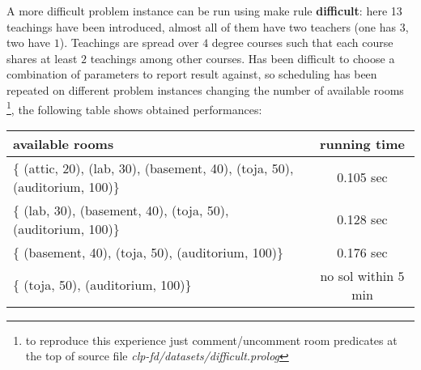 \documentclass[10pt,a4paper]{article} %
\begin{document}
    A more difficult problem instance can be run using make rule \textbf{difficult}:
    here 13 teachings have been introduced, almost all of them have two teachers
    (one has $3$, two have $1$). Teachings are spread over $4$ degree courses
    such that each course shares at least $2$ teachings among other courses.
    Has been difficult to choose a combination of parameters to report result against,
    so scheduling has been repeated on different problem instances changing
    the number of available rooms
    \footnote{to reproduce this experience just comment/uncomment room predicates at the
    top of source file \emph{clp-fd/datasets/difficult.prolog}},
    the following table shows obtained performances:

    \begin{center}
        \begin{tabular}{p{6cm} | c}
            \textbf{available rooms} & \textbf{running time} \\
            \hline
            $ \lbrace $ (attic, 20), (lab, 30), (basement, 40),
                (toja, 50), (auditorium, 100)$ \rbrace $ & 0.105 sec \\
            \hline
            $ \lbrace $ (lab, 30), (basement, 40),
                (toja, 50), (auditorium, 100)$ \rbrace $ & 0.128 sec\\
            \hline
            $ \lbrace $ (basement, 40),
                (toja, 50), (auditorium, 100)$ \rbrace $ & 0.176 sec \\
            \hline
            $ \lbrace $ (toja, 50), (auditorium, 100)$ \rbrace $ & no sol within $5$ min
        \end{tabular}
    \end{center}
\end{document}
